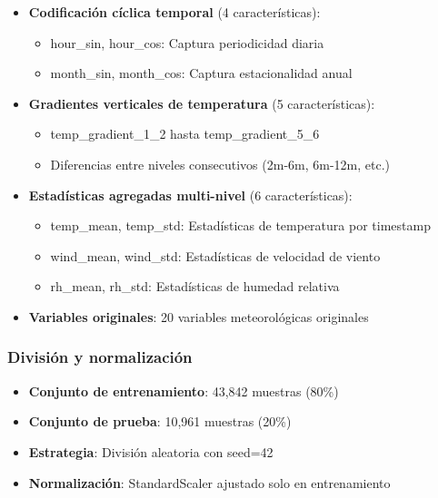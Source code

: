 \begin{itemize}
    \item \textbf{Codificación cíclica temporal} (4 características):
    \begin{itemize}
        \item hour\_sin, hour\_cos: Captura periodicidad diaria
        \item month\_sin, month\_cos: Captura estacionalidad anual
    \end{itemize}

    \item \textbf{Gradientes verticales de temperatura} (5 características):
    \begin{itemize}
        \item temp\_gradient\_1\_2 hasta temp\_gradient\_5\_6
        \item Diferencias entre niveles consecutivos (2m-6m, 6m-12m, etc.)
    \end{itemize}

    \item \textbf{Estadísticas agregadas multi-nivel} (6 características):
    \begin{itemize}
        \item temp\_mean, temp\_std: Estadísticas de temperatura por timestamp
        \item wind\_mean, wind\_std: Estadísticas de velocidad de viento
        \item rh\_mean, rh\_std: Estadísticas de humedad relativa
    \end{itemize}

    \item \textbf{Variables originales}: 20 variables meteorológicas originales
\end{itemize}

\subsubsection{División y normalización}
\begin{itemize}
    \item \textbf{Conjunto de entrenamiento}: 43,842 muestras (80\%)
    \item \textbf{Conjunto de prueba}: 10,961 muestras (20\%)
    \item \textbf{Estrategia}: División aleatoria con seed=42
    \item \textbf{Normalización}: StandardScaler ajustado solo en entrenamiento
\end{itemize}

